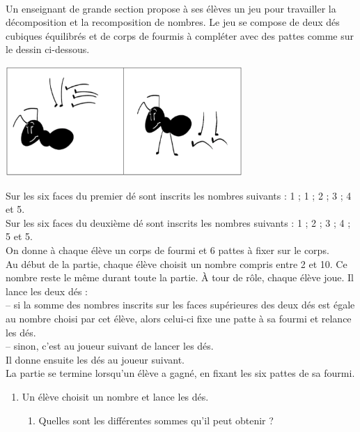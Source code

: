 \begin{activite}
   \ \\ [-16mm]
   \begin{QCM}
      Un enseignant de grande section propose à ses élèves un jeu pour travailler la décomposition et la recomposition de nombres. Le jeu se compose de deux dés cubiques équilibrés et de corps de fourmis à compléter avec des pattes comme sur le dessin ci-dessous.
      \begin{center}
         \includegraphics[width=9cm]{Organisation_gestion_donnees/Images/D7_ex_fourmis}
      \end{center}
      Sur les six faces du premier dé sont inscrits les nombres suivants : 1 ; 1 ; 2 ; 3 ; 4 et 5. \\
      Sur les six faces du deuxième dé sont inscrits les nombres suivants : 1 ; 2 ; 3 ; 4 ; 5 et 5. \\
      On donne à chaque élève un corps de fourmi et 6 pattes à fixer sur le corps. \\
      Au début de la partie, chaque élève choisit un nombre compris entre 2 et 10. Ce nombre reste le même durant toute la partie. À tour de rôle, chaque élève joue. Il lance les deux dés : \\
      -- si la somme des nombres inscrits sur les faces supérieures des deux dés est égale au nombre choisi par cet élève, alors celui-ci fixe une patte à sa fourmi et relance les dés. \\
      -- sinon, c’est au joueur suivant de lancer les dés. \\
      Il donne ensuite les dés au joueur suivant. \\
      La partie se termine lorsqu’un élève a gagné, en fixant les six pattes de sa fourmi.
      \begin{enumerate}
         \item Un élève choisit un nombre et lance les dés.
            \begin{enumerate}
               \item Quelles sont les différentes sommes qu’il peut obtenir ?

\end{enumerate}
\end{enumerate}
\end{QCM}
\end{activite}
